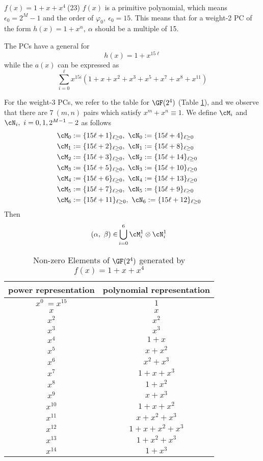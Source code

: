\begin{example}
$f(x)= 1+x+x^4~$(23)\newline
$f(x)$ is a primitive polynomial, which means $\epsilon_0=2^M-1$ and the order of $\varphi_0,~\epsilon_0=15$. This means that for a weight-2 PC of the form $h(x)=1+x^{\alpha},~\alpha$ should be a multiple of 15.

The PCs have a general for
$$h(x)=1+x^{15\ell}$$
while the $a(x)$ can be expressed as 
$$ \sum_{i=0}^{\ell} x^{15i} \left(1 +x +x^2 +x^3+x^5+x^7+x^8+x^{11} \right)$$


For the weight-3 PCs, we refer to the table for $\GF(2^4)$ (Table \ref{gf-16-table}), and we observe that there are $7~(m,n)$ pairs which satisfy $x^m+x^n \equiv 1$. We define $\cM_i$ and $\cN_i,~i=0,1,2^{M-1}-2$ as follows
\begin{align}
	\cM_0 &:= \{15\ell + 1\}_{\ell \geq 0},~\cN_0 := \{15\ell + 4\}_{\ell \geq 0}\cr
	\cM_1 &:= \{15\ell + 2\}_{\ell \geq 0},~\cN_1 := \{15\ell + 8\}_{\ell \geq 0}\cr
	\cM_2 &:= \{15\ell + 3\}_{\ell \geq 0},~\cN_2 := \{15\ell + 14\}_{\ell \geq 0}\cr
	\cM_3 &:= \{15\ell + 5\}_{\ell \geq 0},~\cN_3 := \{15\ell + 10\}_{\ell \geq 0}\cr
	\cM_4 &:= \{15\ell + 6\}_{\ell \geq 0},~\cN_4 := \{15\ell + 13\}_{\ell \geq 0}\cr
	\cM_5 &:= \{15\ell + 7\}_{\ell \geq 0},~\cN_5 := \{15\ell + 9\}_{\ell \geq 0}\cr
	\cM_6 &:= \{15\ell + 11\}_{\ell \geq 0},~\cN_6 := \{15\ell + 12\}_{\ell \geq 0}
\end{align}
Then 
\begin{equation*}
\begin{split}
(\alpha,~\beta) \in &\bigcup_{i=0}^6 \cM_i^1\otimes\cN_i^1 
\end{split}
\end{equation*}

\begin{table}[htbp]
 \caption{Non-zero Elements of $\GF (2^4)$ generated by $f(x)=1+x+x^4$}
\centering
 \begin{tabular}{c c} 
 \toprule
 power representation & polynomial representation \\ [0.5ex] 
\midrule
$x^0~=x^{15}$ & $1$\\
\hline
$x$ & $x$\\
\hline
$x^2$ &  $x^2$\\
\hline
$x^3$ &  $x^3$\\
\hline
$x^4$ &  $1+x$\\
\hline
$x^5$ &  $x+x^2$\\
\hline
$x^6$ &  $x^2+x^3$\\
\hline
$x^7$ &  $1+x+x^3$\\
\hline
$x^8$ &  $1+x^2$\\
\hline
$x^9$ &  $x+x^3$\\
\hline
$x^{10}$ &  $1+x+x^2$\\
\hline
$x^{11}$ &  $x+x^2+x^3$\\
\hline
$x^{12}$ &  $1+x+x^2+x^3$\\
\hline
$x^{13}$ &  $1+x^2+x^3$\\
\hline
$x^{14}$ &  $1+x^3$\\
 \bottomrule
 \end{tabular}
 \label{gf-16-table}
\end{table}
\end{example}

